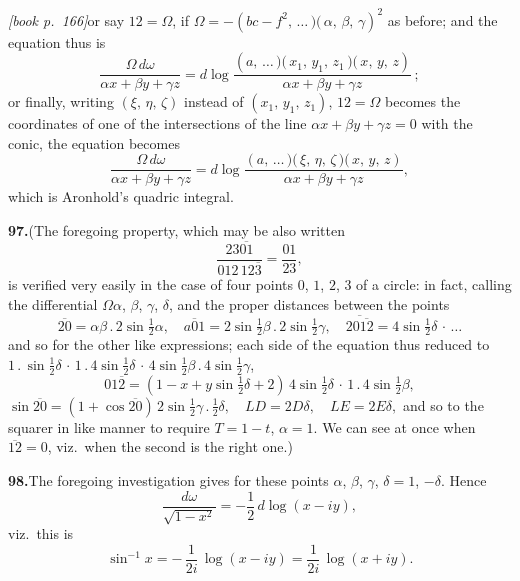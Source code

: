 \documentclass[11pt,a4paper]{article}
\begin{document}
\medskip\noindent\textit{[book p.~166]}\quad or say $12 = \Omega$, if $\Omega = -(bc - f^2,\,\ldots\!\,\mbox{$)\!($}\,\alpha,\,\beta,\,\gamma)^2$ as before; and the equation thus is
\[
\frac{\Omega\,d\omega}{\alpha x + \beta y + \gamma z} = d\log\frac{(a,\,\ldots\!\,\mbox{$)\!($}\,x_1,\,y_1,\,z_1\,\mbox{$)\!($}\,x,\,y,\,z)}{\alpha x + \beta y + \gamma z}\,;
\]
or finally, writing $(\xi,\,\eta,\,\zeta)$ instead of $(x_1,\,y_1,\,z_1)$, $12 = \Omega$ becomes the coordinates of one of the intersections of the line $\alpha x + \beta y + \gamma z = 0$ with the conic, the equation becomes
\[
\frac{\Omega\,d\omega}{\alpha x + \beta y + \gamma z} = d\log\frac{(a,\,\ldots\!\,\mbox{$)\!($}\,\xi,\,\eta,\,\zeta\,\mbox{$)\!($}\,x,\,y,\,z)}{\alpha x + \beta y + \gamma z},
\]
which is Aronhold's quadric integral.

\medskip\noindent\textbf{97.}\quad (The foregoing property, which may be also written
\[
\frac{23\overline{01}}{012\,12\overline{3}} = \frac{01}{23},
\]
is verified very easily in the case of four points $0$, $1$, $2$, $3$ of a circle: in fact, calling the differential $\Omega\alpha$, $\beta$, $\gamma$, $\delta$, and the proper distances between the points
\[
\overline{20} = \alpha\beta\,.\,2\sin\tfrac{1}{2}\alpha,\quad \overline{a01} = 2\sin\tfrac{1}{2}\beta\,.\,2\sin\tfrac{1}{2}\gamma,\quad \overline{20\overline{12}} = 4\sin\tfrac{1}{2}\delta\,\cdot\,\ldots
\]
and so for the other like expressions; each side of the equation thus reduced to $1\,.\,\sin\tfrac{1}{2}\delta\,\cdot\,1\,.\,4\sin\tfrac{1}{2}\delta\,\cdot\,4\sin\tfrac{1}{2}\beta\,.\,4\sin\tfrac{1}{2}\gamma$,
\[
01\overline{2} = (1 - x + y\sin\tfrac{1}{2}\delta + 2)\,4\sin\tfrac{1}{2}\delta\,\cdot\,1\,.\,4\sin\tfrac{1}{2}\beta,
\]
$\sin\overline{20} = (1 + \cos\overline{20})\,2\sin\tfrac{1}{2}\gamma\,.\,\frac{1}{2}\delta,\quad LD = 2D\delta,\quad LE = 2E\delta,$
and so to the squarer in like manner to require $T = 1 - t$, $\alpha = 1$. We can see at once when $\overline{12} = 0$, viz.\ when the second is the right one.)

\medskip\noindent\textbf{98.}\quad The foregoing investigation gives for these points $\alpha$, $\beta$, $\gamma$, $\delta = 1$, $-\delta$. Hence
\[
\frac{d\omega}{\sqrt{1 - x^2}} = -\frac{1}{2}\,d\log(x - iy),
\]
viz.\ this is
\[
\sin^{-1} x = -\,\frac{1}{2i}\,\log(x - iy) = \frac{1}{2i}\,\log(x + iy).
\]
\end{document}
